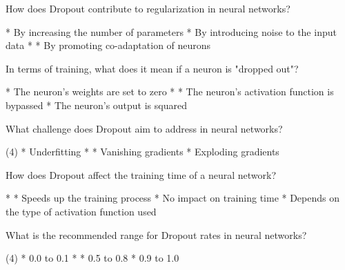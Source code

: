 \documentclass[10pt]{extarticle}
\begin{document}
\begin{exercise}
    How does Dropout contribute to regularization in neural networks?
    \begin{choice}
        * By increasing the number of parameters
        * By introducing noise to the input data
        * 
        * By promoting co-adaptation of neurons
    \end{choice}
\end{exercise}
\begin{solution}
\end{solution}

\begin{exercise}
    In terms of training, what does it mean if a neuron is "dropped out"?
    \begin{choice}
        * The neuron's weights are set to zero
        * 
        * The neuron's activation function is bypassed
        * The neuron's output is squared
    \end{choice}
\end{exercise}
\begin{solution}
\end{solution}

\begin{exercise}
    What challenge does Dropout aim to address in neural networks?
    \begin{choice} (4)
        * Underfitting
        * 
        * Vanishing gradients
        * Exploding gradients
    \end{choice}
\end{exercise}
\begin{solution}
\end{solution}

\begin{exercise}
    How does Dropout affect the training time of a neural network?
    \begin{choice}
        * 
        * Speeds up the training process
        * No impact on training time
        * Depends on the type of activation function used
    \end{choice}
\end{exercise}
\begin{solution}
\end{solution}

\begin{exercise}
    What is the recommended range for Dropout rates in neural networks?
    \begin{choice} (4)
        * 0.0 to 0.1
        * 
        * 0.5 to 0.8
        * 0.9 to 1.0
    \end{choice}
\end{exercise}
\begin{solution}
\end{solution}
\end{document}
